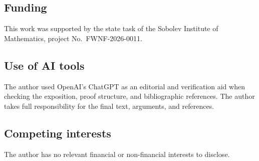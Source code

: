 \documentclass[12pt,a4paper]{article}
\theoremstyle{definition}
\begin{document}
\subsection*{Funding}

This work was supported by the state task of the Sobolev Institute of
Mathematics, project No.~FWNF-2026-0011. 

\subsection*{Use of AI tools}
The author used OpenAI's
ChatGPT as an editorial and verification aid when checking the
exposition, proof structure, and bibliographic references. The author takes
full responsibility for the final text, arguments, and references.

\subsection*{Competing interests}
The author has no relevant financial or non-financial interests to disclose.
\end{document}

